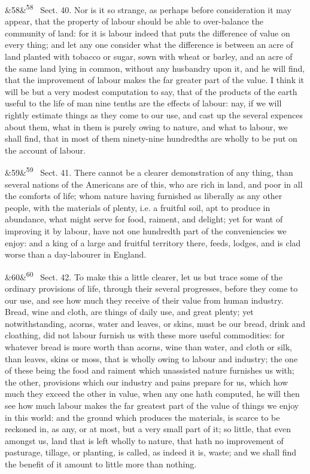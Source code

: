 \documentclass[12pt]{article}
\newcommand{\para}[1][]{\par\noindent\ifx&#1&\else\textsuperscript{\footnotesize #1}~\fi}
\begin{document}
\para[58] Sect. 40. Nor is it so strange, as perhaps before consideration it may appear, that the property of labour should be able to over-balance the community of land: for it is labour indeed that puts the difference of value on every thing; and let any one consider what the difference is between an acre of land planted with tobacco or sugar, sown with wheat or barley, and an acre of the same land lying in common, without any husbandry upon it, and he will find, that the improvement of labour makes the far greater part of the value. I think it will be but a very modest computation to say, that of the products of the earth useful to the life of man nine tenths are the effects of labour: nay, if we will rightly estimate things as they come to our use, and cast up the several expences about them, what in them is purely owing to nature, and what to labour, we shall find, that in most of them ninety-nine hundredths are wholly to be put on the account of labour.

\para[59] Sect. 41. There cannot be a clearer demonstration of any thing, than several nations of the Americans are of this, who are rich in land, and poor in all the comforts of life; whom nature having furnished as liberally as any other people, with the materials of plenty, i.e. a fruitful soil, apt to produce in abundance, what might serve for food, raiment, and delight; yet for want of improving it by labour, have not one hundredth part of the conveniencies we enjoy: and a king of a large and fruitful territory there, feeds, lodges, and is clad worse than a day-labourer in England.

\para[60] Sect. 42. To make this a little clearer, let us but trace some of the ordinary provisions of life, through their several progresses, before they come to our use, and see how much they receive of their value from human industry. Bread, wine and cloth, are things of daily use, and great plenty; yet notwithstanding, acorns, water and leaves, or skins, must be our bread, drink and cloathing, did not labour furnish us with these more useful commodities: for whatever bread is more worth than acorns, wine than water, and cloth or silk, than leaves, skins or moss, that is wholly owing to labour and industry; the one of these being the food and raiment which unassisted nature furnishes us with; the other, provisions which our industry and pains prepare for us, which how much they exceed the other in value, when any one hath computed, he will then see how much labour makes the far greatest part of the value of things we enjoy in this world: and the ground which produces the materials, is scarce to be reckoned in, as any, or at most, but a very small part of it; so little, that even amongst us, land that is left wholly to nature, that hath no improvement of pasturage, tillage, or planting, is called, as indeed it is, waste; and we shall find the benefit of it amount to little more than nothing.
\end{document}
